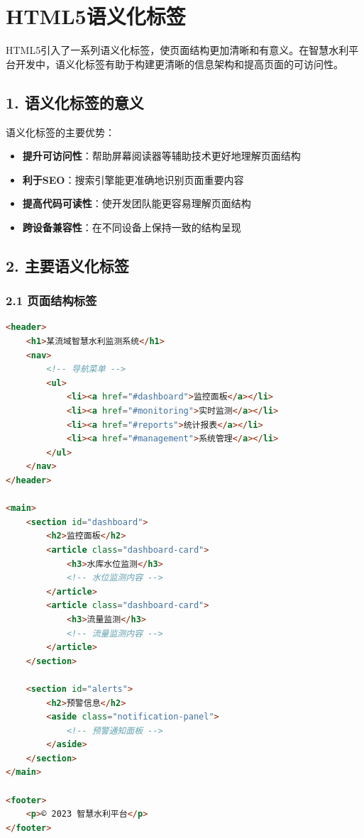 \section{HTML5语义化标签}\label{html5ux8bedux4e49ux5316ux6807ux7b7e}

HTML5引入了一系列语义化标签，使页面结构更加清晰和有意义。在智慧水利平台开发中，语义化标签有助于构建更清晰的信息架构和提高页面的可访问性。

\subsection{1.
语义化标签的意义}\label{ux8bedux4e49ux5316ux6807ux7b7eux7684ux610fux4e49}

语义化标签的主要优势：

\begin{itemize}
\tightlist
\item
  \textbf{提升可访问性}：帮助屏幕阅读器等辅助技术更好地理解页面结构
\item
  \textbf{利于SEO}：搜索引擎能更准确地识别页面重要内容
\item
  \textbf{提高代码可读性}：使开发团队能更容易理解页面结构
\item
  \textbf{跨设备兼容性}：在不同设备上保持一致的结构呈现
\end{itemize}

\subsection{2.
主要语义化标签}\label{ux4e3bux8981ux8bedux4e49ux5316ux6807ux7b7e}

\subsubsection{2.1
页面结构标签}\label{ux9875ux9762ux7ed3ux6784ux6807ux7b7e}

\begin{lstlisting}[language=HTML]
<header>
    <h1>某流域智慧水利监测系统</h1>
    <nav>
        <!-- 导航菜单 -->
        <ul>
            <li><a href="#dashboard">监控面板</a></li>
            <li><a href="#monitoring">实时监测</a></li>
            <li><a href="#reports">统计报表</a></li>
            <li><a href="#management">系统管理</a></li>
        </ul>
    </nav>
</header>

<main>
    <section id="dashboard">
        <h2>监控面板</h2>
        <article class="dashboard-card">
            <h3>水库水位监测</h3>
            <!-- 水位监测内容 -->
        </article>
        <article class="dashboard-card">
            <h3>流量监测</h3>
            <!-- 流量监测内容 -->
        </article>
    </section>
    
    <section id="alerts">
        <h2>预警信息</h2>
        <aside class="notification-panel">
            <!-- 预警通知面板 -->
        </aside>
    </section>
</main>

<footer>
    <p>© 2023 智慧水利平台</p>
</footer>
\end{lstlisting}

